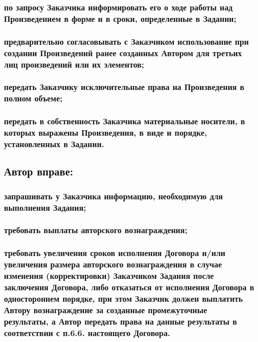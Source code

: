 \documentclass[12pt]{article}
\begin{document}
\subsubsection{по запросу Заказчика информировать его о ходе работы над Произведением в форме и в сроки, определенные в Задании;}

\subsubsection{предварительно согласовывать с Заказчиком использование при создании Произведений ранее созданных Автором для третьих лиц произведений или их элементов;}

\subsubsection{передать Заказчику исключительные права на Произведения в полном объеме;}

\subsubsection{передать в собственность Заказчика материальные носители, в которых выражены Произведения, в виде и порядке, установленных в Задании.}

\subsection{Автор вправе:}

\subsubsection{запрашивать у Заказчика информацию, необходимую для выполнения Задания;}

\subsubsection{требовать выплаты авторского вознаграждения;}

\subsubsection{требовать увеличения сроков исполнения Договора и/или увеличения размера авторского вознаграждения в случае изменения (корректировки) Заказчиком Задания после заключения Договора, либо отказаться от исполнения Договора в одностороннем порядке, при этом Заказчик должен выплатить Автору вознаграждение за созданные промежуточные результаты, а Автор передать права на данные результаты в соответствии с п.6.6. настоящего Договора.}
\end{document}
